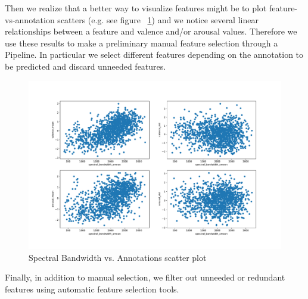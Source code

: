 Then we realize that a better way to visualize features might be to plot feature-vs-annotation scatters (e.g. see figure ~\ref{fig:scatter-spectral_bandwidth_amean}) and we notice several linear relationships between a feature and valence and/or arousal values. Therefore we use these results to make a preliminary manual feature selection through a Pipeline. In particular we select different features depending on the annotation to be predicted and discard unneeded features.

\begin{figure}
	\centering
	\includegraphics[width=0.9\linewidth]{assets/scatter-spectral_bandwidth_amean.pdf}
	\caption{Spectral Bandwidth vs. Annotations scatter plot}
	\label{fig:scatter-spectral_bandwidth_amean}
\end{figure}

Finally, in addition to manual selection, we filter out unneeded or redundant features using automatic feature selection tools.